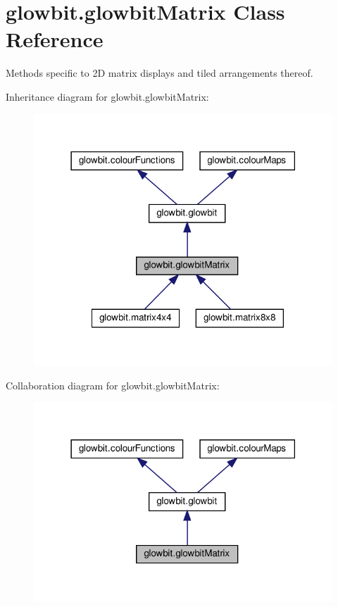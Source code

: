 \hypertarget{classglowbit_1_1glowbitMatrix}{}\section{glowbit.\+glowbit\+Matrix Class Reference}
\label{classglowbit_1_1glowbitMatrix}


Methods specific to 2D matrix displays and tiled arrangements thereof.  




Inheritance diagram for glowbit.\+glowbit\+Matrix\+:\nopagebreak
\begin{figure}[H]
\begin{center}
\leavevmode
\includegraphics[width=318pt]{classglowbit_1_1glowbitMatrix__inherit__graph}
\end{center}
\end{figure}


Collaboration diagram for glowbit.\+glowbit\+Matrix\+:\nopagebreak
\begin{figure}[H]
\begin{center}
\leavevmode
\includegraphics[width=318pt]{classglowbit_1_1glowbitMatrix__coll__graph}
\end{center}
\end{figure}
